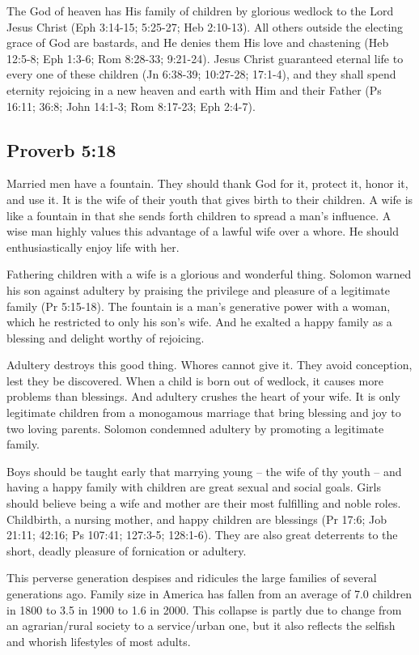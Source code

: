 The God of heaven has His family of children by glorious wedlock to the Lord Jesus Christ (Eph 3:14-15; 5:25-27; Heb 2:10-13). All others outside the electing grace of God are bastards, and He denies them His love and chastening (Heb 12:5-8; Eph 1:3-6; Rom 8:28-33; 9:21-24). Jesus Christ guaranteed eternal life to every one of these children (Jn 6:38-39; 10:27-28; 17:1-4), and they shall spend eternity rejoicing in a new heaven and earth with Him and their Father (Ps 16:11; 36:8; John 14:1-3; Rom 8:17-23; Eph 2:4-7).

\subsection{Proverb 5:18}
Married men have a fountain. They should thank God for it, protect it, honor it, and use it. It is the wife of their youth that gives birth to their children. A wife is like a fountain in that she sends forth children to spread a man’s influence. A wise man highly values this advantage of a lawful wife over a whore. He should enthusiastically enjoy life with her.

Fathering children with a wife is a glorious and wonderful thing. Solomon warned his son against adultery by praising the privilege and pleasure of a legitimate family (Pr 5:15-18). The fountain is a man’s generative power with a woman, which he restricted to only his son’s wife. And he exalted a happy family as a blessing and delight worthy of rejoicing.

Adultery destroys this good thing. Whores cannot give it. They avoid conception, lest they be discovered. When a child is born out of wedlock, it causes more problems than blessings. And adultery crushes the heart of your wife. It is only legitimate children from a monogamous marriage that bring blessing and joy to two loving parents. Solomon condemned adultery by promoting a legitimate family.

Boys should be taught early that marrying young – the wife of thy youth – and having a happy family with children are great sexual and social goals. Girls should believe being a wife and mother are their most fulfilling and noble roles. Childbirth, a nursing mother, and happy children are blessings (Pr 17:6; Job 21:11; 42:16; Ps 107:41; 127:3-5; 128:1-6). They are also great deterrents to the short, deadly pleasure of fornication or adultery.

This perverse generation despises and ridicules the large families of several generations ago. Family size in America has fallen from an average of 7.0 children in 1800 to 3.5 in 1900 to 1.6 in 2000. This collapse is partly due to change from an agrarian/rural society to a service/urban one, but it also reflects the selfish and whorish lifestyles of most adults.

